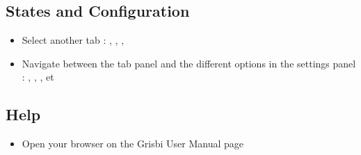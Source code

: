 \subsection{States and Configuration}

\begin{itemize}
	\item Select another tab : , , , 
	\item Navigate between the tab panel and the different options in the settings panel : , , ,  et 
\end{itemize}

\subsection{Help}

\begin{itemize}
	\item Open your browser on the Grisbi User Manual page 
\end{itemize}













